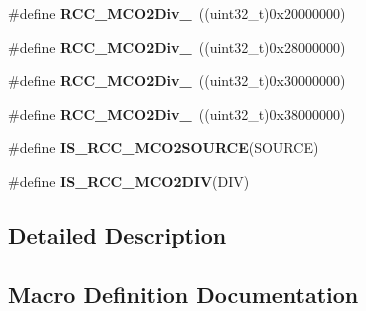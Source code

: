\begin{DoxyCompactItemize}
\item 
\#define {\bfseries R\+C\+C\+\_\+\+M\+C\+O2\+Div\+\_}~((uint32\+\_\+t)0x20000000)\hypertarget{group___r_c_c___m_c_o2___clock___source___prescaler_gac64afcfec90f2783fd78887e8a783ecb}{}\label{group___r_c_c___m_c_o2___clock___source___prescaler_gac64afcfec90f2783fd78887e8a783ecb}

\item 
\#define {\bfseries R\+C\+C\+\_\+\+M\+C\+O2\+Div\+\_}~((uint32\+\_\+t)0x28000000)\hypertarget{group___r_c_c___m_c_o2___clock___source___prescaler_gad94c96c38025e6a5164bc277d87173a6}{}\label{group___r_c_c___m_c_o2___clock___source___prescaler_gad94c96c38025e6a5164bc277d87173a6}

\item 
\#define {\bfseries R\+C\+C\+\_\+\+M\+C\+O2\+Div\+\_}~((uint32\+\_\+t)0x30000000)\hypertarget{group___r_c_c___m_c_o2___clock___source___prescaler_ga3ff14a7e8bb898eadf24d879ee41069f}{}\label{group___r_c_c___m_c_o2___clock___source___prescaler_ga3ff14a7e8bb898eadf24d879ee41069f}

\item 
\#define {\bfseries R\+C\+C\+\_\+\+M\+C\+O2\+Div\+\_}~((uint32\+\_\+t)0x38000000)\hypertarget{group___r_c_c___m_c_o2___clock___source___prescaler_gac47804a0bf27b079a23dd532d5482cf9}{}\label{group___r_c_c___m_c_o2___clock___source___prescaler_gac47804a0bf27b079a23dd532d5482cf9}

\item 
\#define {\bfseries I\+S\+\_\+\+R\+C\+C\+\_\+\+M\+C\+O2\+S\+O\+U\+R\+CE}(S\+O\+U\+R\+CE)
\item 
\#define {\bfseries I\+S\+\_\+\+R\+C\+C\+\_\+\+M\+C\+O2\+D\+IV}(D\+IV)
\end{DoxyCompactItemize}


\subsection{Detailed Description}


\subsection{Macro Definition Documentation}
